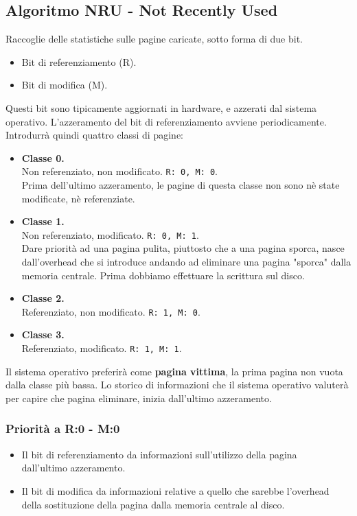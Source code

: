 \documentclass{report}
\begin{document}
\subsection{Algoritmo NRU - Not Recently Used}
Raccoglie delle statistiche sulle pagine caricate, sotto forma di due bit.
\begin{itemize}
    \item Bit di referenziamento (R).
    \item Bit di modifica (M).
\end{itemize}
Questi bit sono tipicamente aggiornati in hardware, e azzerati dal sistema operativo. L'azzeramento del bit di referenziamento avviene periodicamente.\\
Introdurrà quindi quattro classi di pagine:
\begin{itemize}
    \item \textbf{Classe 0.}\\
    Non referenziato, non modificato. \verb|R: 0, M: 0|.\\
    Prima dell'ultimo azzeramento, le pagine di questa classe non sono nè state modificate, nè referenziate.
    \item \textbf{Classe 1.}\\
    Non referenziato, modificato. \verb|R: 0, M: 1|.\\
    Dare priorità ad una pagina pulita, piuttosto che a una pagina sporca, nasce dall'overhead che si introduce andando ad eliminare una pagina "sporca" dalla memoria centrale. Prima dobbiamo effettuare la scrittura sul disco.
    \item \textbf{Classe 2.}\\
    Referenziato, non modificato. \verb|R: 1, M: 0|.
    \item \textbf{Classe 3.}\\
    Referenziato, modificato. \verb|R: 1, M: 1|.
\end{itemize}

Il sistema operativo preferirà come \textbf{pagina vittima}, la prima pagina non vuota dalla classe più bassa. Lo storico di informazioni che il sistema operativo valuterà per capire che pagina eliminare, inizia dall'ultimo azzeramento.

\subsubsection{Priorità a R:0 - M:0}
\begin{itemize}
    \item Il bit di referenziamento da informazioni sull'utilizzo della pagina \\dall'ultimo azzeramento.
    \item Il bit di modifica da informazioni relative a quello che sarebbe l'overhead della sostituzione della pagina dalla memoria centrale al disco.
\end{itemize}
\end{document}
